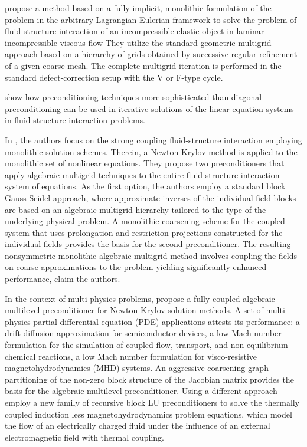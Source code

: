 \cite{hron_monolithic_2006} propose a method based on a fully implicit, monolithic formulation of the problem in the arbitrary Lagrangian-Eulerian framework  to solve the problem of fluid-structure interaction of an incompressible elastic object in laminar incompressible viscous flow
They utilize the standard geometric multigrid approach based on a hierarchy of grids obtained by successive regular refinement of a given coarse mesh.
The complete multigrid iteration is performed in the standard defect-correction setup with the V or F-type cycle.

\cite{tezduyar2006space} show how preconditioning techniques more sophisticated than diagonal preconditioning can be used in iterative solutions of the linear equation systems in fluid-structure interaction problems.

In \cite{gee_truly_2011}, the authors focus on the strong coupling fluid-structure interaction employing monolithic solution schemes.
Therein, a Newton-Krylov method is applied to the monolithic set of nonlinear equations.
They propose two preconditioners that apply algebraic multigrid techniques to the entire fluid-structure interaction system of equations.
As the first option, the authors employ a standard block Gauss-Seidel approach, where approximate inverses of the individual field blocks are based on an algebraic multigrid hierarchy tailored to the type of the underlying physical problem.
A monolithic coarsening scheme for the coupled system that uses prolongation and restriction projections constructed for the individual fields provides the basis for the second preconditioner.
The resulting nonsymmetric monolithic algebraic multigrid method involves coupling the fields on coarse approximations to the problem yielding significantly enhanced performance, claim the authors.

In the context of multi-physics problems, \cite{https://doi.org/10.1002/fld.2402} propose a fully coupled algebraic multilevel preconditioner for Newton-Krylov solution methods.
A set of multi-physics partial differential equation (PDE) applications attests its performance: a drift-diffusion approximation for semiconductor devices,
a low Mach number formulation for the simulation of coupled flow, transport, and non-equilibrium chemical reactions,
a low Mach number formulation for visco-resistive magnetohydrodynamics (MHD) systems.
An aggressive-coarsening graph-partitioning of the non-zero block structure of the Jacobian matrix provides the basis for the algebraic multilevel preconditioner.
Using a different approach \cite{badia_block_2014} employ a new family of recursive block LU preconditioners to solve the thermally coupled induction less magnetohydrodynamics problem equations, which model the flow of an electrically charged fluid under the influence of an external electromagnetic field with thermal coupling.

